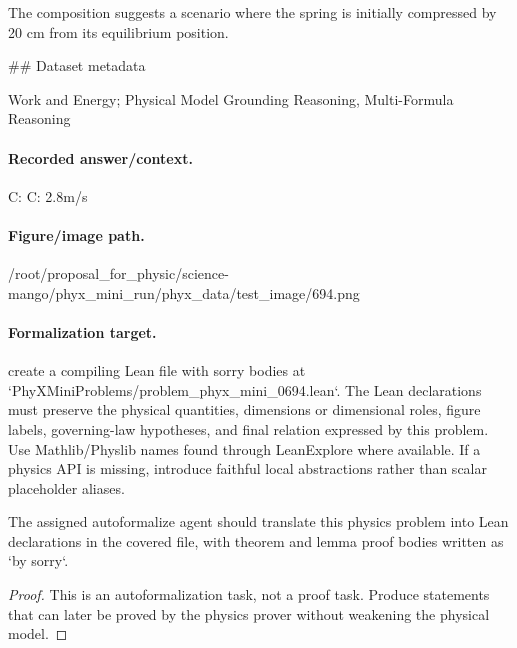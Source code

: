 The composition suggests a scenario where the spring is initially compressed by 20 cm from its equilibrium position.

\#\# Dataset metadata

Work and Energy; Physical Model Grounding Reasoning, Multi-Formula Reasoning

\paragraph{Recorded answer/context.}
C: C: 2.8m/s

\paragraph{Figure/image path.}
/root/proposal\_for\_physic/science-mango/phyx\_mini\_run/phyx\_data/test\_image/694.png

\paragraph{Formalization target.}
create a compiling Lean file with sorry bodies at `PhyXMiniProblems/problem\_phyx\_mini\_0694.lean`. The Lean declarations must preserve the physical quantities, dimensions or dimensional roles, figure labels, governing-law hypotheses, and final relation expressed by this problem.
Use Mathlib/Physlib names found through LeanExplore where available. If a physics API is missing, introduce faithful local abstractions rather than scalar placeholder aliases.

\begin{theorem}
\label{thm:physics:phyx_mini_0694:target}
The assigned autoformalize agent should translate this physics problem into Lean declarations in the covered file, with theorem and lemma proof bodies written as `by sorry`.
\end{theorem}
\begin{proof}
This is an autoformalization task, not a proof task. Produce statements that can later be proved by the physics prover without weakening the physical model.
\end{proof}

